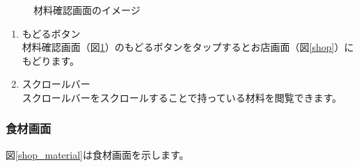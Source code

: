\documentclass[a4j]{jarticle}
\begin{document}
\begin{figure}[H]
    \begin{center}
    \caption {材料確認画面のイメージ}
    \label{have}
    \end{center}
\end{figure}

\begin{enumerate}
  \renewcommand{\labelenumi}{\textcircled{\scriptsize \theenumi}}
\item もどるボタン\\
  材料確認画面（図\ref{have}）のもどるボタンをタップするとお店画面（図\ref{shop}）にもどります。
\item スクロールバー\\
  スクロールバーをスクロールすることで持っている材料を閲覧できます。
\end{enumerate}

\newpage
\subsubsection{食材画面}
図\ref{shop_material}は食材画面を示します。\\
\end{document}

